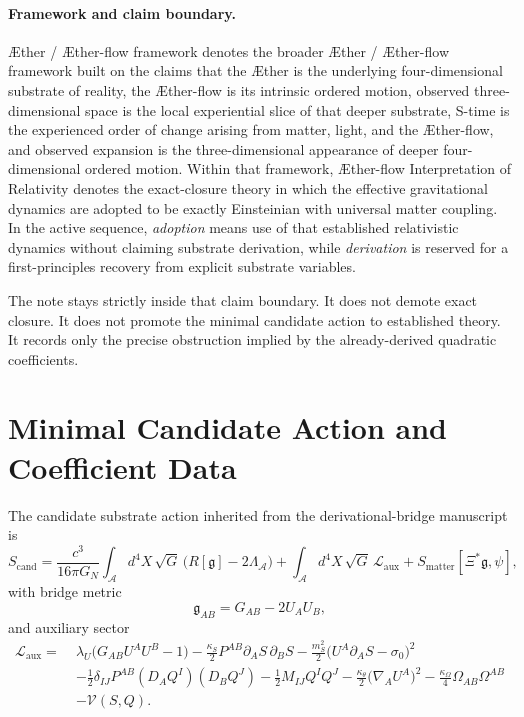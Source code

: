 \documentclass[11pt]{article}
\newcommand{\Aether}{\AE{}ther}
\newcommand{\Aflow}{\AE{}ther-flow}
\newcommand{\TheoryName}{\Aflow{} Interpretation of Relativity}
\newcommand{\TheoryProgram}{\Aether{} / \Aflow{} framework}
\newcommand{\Sub}{\mathcal{A}}
\newcommand{\BridgeMetric}{\mathfrak{g}}
\begin{document}
\paragraph{Framework and claim boundary.}
\TheoryProgram{} denotes the broader \Aether{} / \Aflow{} framework built on the claims that the \Aether{} is the underlying four-dimensional substrate of reality, the \Aflow{} is its intrinsic ordered motion, observed three-dimensional space is the local experiential slice of that deeper substrate, S-time is the experienced order of change arising from matter, light, and the \Aflow{}, and observed expansion is the three-dimensional appearance of deeper four-dimensional ordered motion. Within that framework, \TheoryName{} denotes the exact-closure theory in which the effective gravitational dynamics are adopted to be exactly Einsteinian with universal matter coupling. In the active sequence, \emph{adoption} means use of that established relativistic dynamics without claiming substrate derivation, while \emph{derivation} is reserved for a first-principles recovery from explicit substrate variables.

The note stays strictly inside that claim boundary. It does not demote exact closure. It does not promote the minimal candidate action to established theory. It records only the precise obstruction implied by the already-derived quadratic coefficients.

\section{Minimal Candidate Action and Coefficient Data}

The candidate substrate action inherited from the derivational-bridge manuscript is
\begin{equation}
S_{\mathrm{cand}}
=
\frac{c^3}{16\pi G_N}
\int_{\Sub} d^4X\,\sqrt{G}\,\bigl(R[\BridgeMetric]-2\Lambda_{\Sub}\bigr)
+
\int_{\Sub} d^4X\,\sqrt{G}\,\mathcal{L}_{\mathrm{aux}}
+
S_{\mathrm{matter}}[\Xi^*\BridgeMetric,\psi],
\label{eq:Scand}
\end{equation}
with bridge metric
\begin{equation}
\BridgeMetric_{AB}=G_{AB}-2U_AU_B,
\label{eq:bridgemetric}
\end{equation}
and auxiliary sector
\begin{align}
\mathcal{L}_{\mathrm{aux}}
=\;&
\lambda_U\bigl(G_{AB}U^A U^B-1\bigr)
-\frac{\kappa_S}{2}P^{AB}\partial_A S\,\partial_B S
-\frac{m_S^2}{2}\bigl(U^A\partial_A S-\sigma_0\bigr)^2
\nonumber\\
&-\frac{1}{2}\delta_{IJ}P^{AB}(D_AQ^I)(D_BQ^J)
-\frac{1}{2}M_{IJ}Q^IQ^J
-\frac{\kappa_\theta}{2}\bigl(\nabla_AU^A\bigr)^2
-\frac{\kappa_\Omega}{4}\Omega_{AB}\Omega^{AB}
\nonumber\\
&-\mathcal V(S,Q).
\label{eq:Laux}
\end{align}
\end{document}
